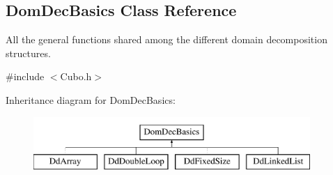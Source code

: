 \hypertarget{classDomDecBasics}{\subsection{\-Dom\-Dec\-Basics \-Class \-Reference}
\label{classDomDecBasics}
}


\-All the general functions shared among the different domain decomposition structures.  




{\ttfamily \#include $<$\-Cubo.\-h$>$}

\-Inheritance diagram for \-Dom\-Dec\-Basics\-:\begin{figure}[H]
\begin{center}
\leavevmode
\includegraphics[height=2.000000cm]{classDomDecBasics}
\end{center}
\end{figure}
